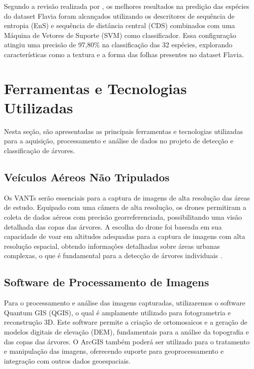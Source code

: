\documentclass[
    12pt,                   %
    openright,              %
    oneside,                %
    a4paper,                %
    sumario=tradicional,    %
    english,                %
    brazil,                 %
    ]{abntex2}
\begin{document}
    Segundo a revisão realizada por \textcite{waldchen2018plant}, os melhores resultados na predição das espécies do dataset Flavia foram alcançados utilizando os descritores de sequência de entropia (EnS) e sequência de distância central (CDS) combinados com uma Máquina de Vetores de Suporte (SVM) como classificador. Essa configuração atingiu uma precisão de 97,80\% na classificação das 32 espécies, explorando características como a textura e a forma das folhas presentes no dataset Flavia.

 

\section{Ferramentas e Tecnologias Utilizadas}
   Nesta seção, são apresentadas as principais ferramentas e tecnologias utilizadas para a aquisição, processamento e análise de dados no projeto de detecção e classificação de árvores.
   
\subsection{Veículos Aéreos Não Tripulados}
    Os VANTs serão essenciais para a captura de imagens de alta resolução das áreas de estudo. Equipado com uma câmera de alta resolução, os drones permitiram a coleta de dados aéreos com precisão georreferenciada, possibilitando uma visão detalhada das copas das árvores. A escolha do drone foi baseada em sua capacidade de voar em altitudes adequadas para a captura de imagens com alta resolução espacial, obtendo informações detalhadas sobre áreas urbanas complexas,  o que é fundamental para a detecção de árvores individuais \cite{wu2024fine}.

\subsection{Software de Processamento de Imagens}
    Para o processamento e análise das imagens capturadas, utilizaremos o software Quantum GIS (QGIS), o qual é amplamente utilizado para fotogrametria e reconstrução 3D. Este software permite a criação de ortomosaicos e a geração de modelos digitais de elevação (DEM), fundamentais para a análise da topografia e das copas das árvores. O ArcGIS também poderá ser utilizado para o tratamento e manipulação das imagens, oferecendo suporte para geoprocessamento e integração com outros dados geoespaciais.
\end{document}

